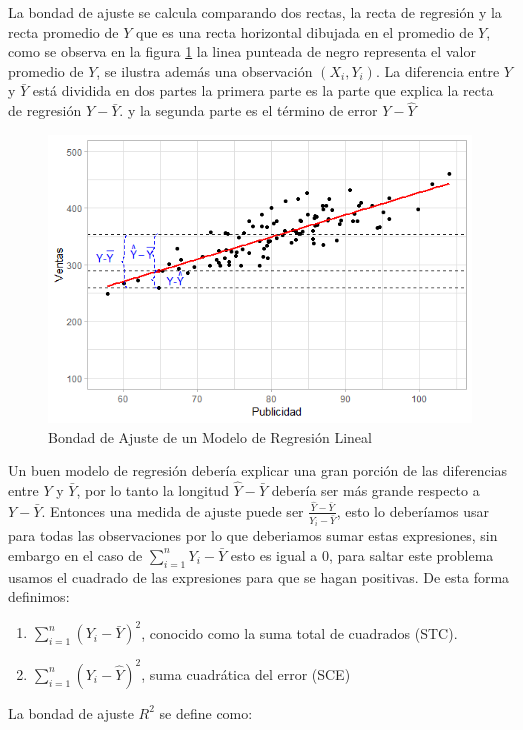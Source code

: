 \documentclass[letterpaper,]{book}
\providecommand{\tightlist}{%
  \setlength{\itemsep}{0pt}\setlength{\parskip}{0pt}}
\begin{document}
La bondad de ajuste se calcula comparando dos rectas, la recta de regresión y la recta promedio de \(Y\) que es una recta horizontal dibujada en el promedio de \(Y\), como se observa en la figura \ref{fig:determinacion} la linea punteada de negro representa el valor promedio de \(Y\), se ilustra además una observación \(\left(X_i,Y_i\right)\). La diferencia entre \(Y\) y \(\bar{Y}\) está dividida en dos partes la primera parte es la parte que explica la recta de regresión \(\hat{Y}-\bar{Y}\). y la segunda parte es el término de error \(Y-\hat{Y}\)

\begin{figure}[!h]

{\centering \includegraphics[width=0.5\linewidth]{error5} 

}

\caption{Bondad de Ajuste de un Modelo de Regresión Lineal}\label{fig:determinacion}
\end{figure}

Un buen modelo de regresión debería explicar una gran porción de las diferencias entre \(Y\) y \(\bar{Y}\), por lo tanto la longitud \(\hat{Y}-\bar{Y}\) debería ser más grande respecto a \(Y-\bar{Y}\). Entonces una medida de ajuste puede ser \(\frac{\hat{Y}-\bar{Y}}{Y_i-\bar{Y}}\), esto lo deberíamos usar para todas las observaciones por lo que deberiamos sumar estas expresiones, sin embargo en el caso de \(\sum_{i=1}^{n}{Y_i-\bar{Y}}\) esto es igual a \(0\), para saltar este problema usamos el cuadrado de las expresiones para que se hagan positivas. De esta forma definimos:

\begin{enumerate}
\def\labelenumi{\arabic{enumi}.}
\tightlist
\item
  \(\sum_{i=1}^{n}{\left(Y_i-\bar{Y}\right)^2}\), conocido como la suma total de cuadrados (STC).
\item
  \(\sum_{i=1}^{n}{\left(Y_i-\hat{Y}\right)^2}\), suma cuadrática del error (SCE)
\end{enumerate}

La bondad de ajuste \(R^2\) se define como:
\end{document}
